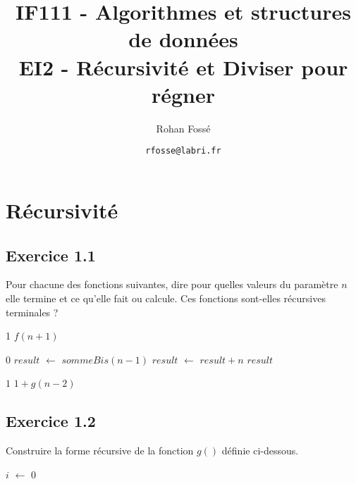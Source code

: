 \documentclass{article}[12pt]
\title{IF111 - Algorithmes et structures de données\\EI2 - Récursivité et Diviser pour régner}
\date{\texttt{rfosse@labri.fr}}
\author{Rohan Fossé}
\newcommand*\Let[2]{\State #1 $\gets$ #2}
\begin{document}
\maketitle{}

\section{Récursivité}

\subsection*{Exercice 1.1}
Pour chacune des fonctions suivantes, dire pour quelles valeurs du paramètre $n$ elle termine et ce qu'elle fait ou calcule. Ces fonctions sont-elles récursives terminales ?

\begin{tcolorbox}
        \begin{algorithmic}[1]
        \State{} 1
    \Else
        \State{} $f(n+1)$
    \EndIf
  \EndFunction
  \end{algorithmic}
  
        \begin{algorithmic}[1]
        \State{} 0
    \Else
        \Let{$result$}{$sommeBis(n - 1)$}
        \Let{$result$}{$result + n$}
        \State{} $result$
    \EndIf
  \EndFunction
  \end{algorithmic}
  
        \begin{algorithmic}[1]
        \State{} $1$
    \Else
        \State{} $1 + g(n - 2)$
    \EndIf
  \EndFunction
  \end{algorithmic}
 \end{tcolorbox} 


\subsection*{Exercice 1.2}

Construire la forme récursive de la fonction $g()$ définie ci-dessous.

\begin{tcolorbox}
        \begin{algorithmic}[1]
    \Let{$i$}{$0$}
        \State{}
    \EndFor
  \EndFunction
  \end{algorithmic}

 \end{tcolorbox} 
\end{document}
